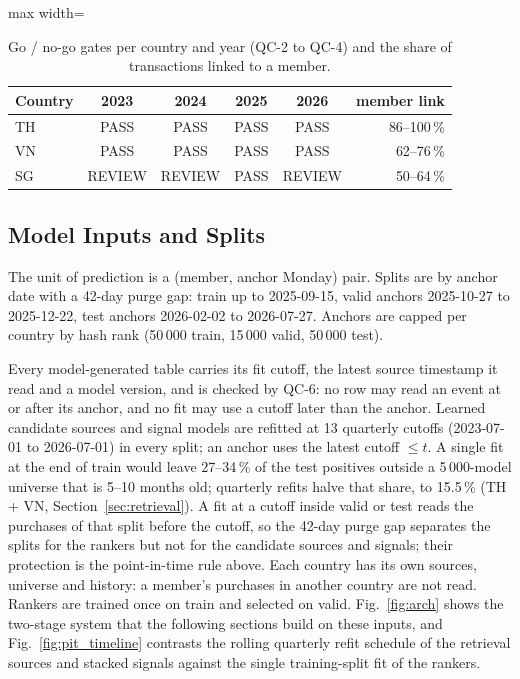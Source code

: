 \documentclass{ieeeaccess}
\begin{document}
\begin{table}[t]
\caption{Go / no-go gates per country and year (QC-2 to QC-4) and the share of transactions linked to a member.}
\label{tab:gates}
\setlength{\tabcolsep}{4pt}
\centering
\begin{adjustbox}{max width=\columnwidth}
\begin{tabular}{lccccr}
\toprule
Country & 2023 & 2024 & 2025 & 2026 & member link \\
\midrule
TH & PASS   & PASS   & PASS & PASS   & 86--100\,\% \\
VN & PASS   & PASS   & PASS & PASS   & 62--76\,\% \\
SG & REVIEW & REVIEW & PASS & REVIEW & 50--64\,\% \\
\bottomrule
\end{tabular}
\end{adjustbox}
\end{table}

\subsection{Model Inputs and Splits}
The unit of prediction is a (member, anchor Monday) pair. Splits are by anchor date with a 42-day purge gap: train up to
2025-09-15, valid anchors 2025-10-27 to 2025-12-22, test anchors 2026-02-02 to 2026-07-27. Anchors are capped per country by hash
rank (50\,000 train, 15\,000 valid, 50\,000 test).

Every model-generated table carries its fit cutoff, the latest source timestamp it read and a model version, and is checked by QC-6:
no row may read an event at or after its anchor, and no fit may use a cutoff later than the anchor. Learned candidate sources and
signal models are refitted at 13 quarterly cutoffs (2023-07-01 to 2026-07-01) in every split; an anchor uses the latest cutoff
$\le t$. A single fit at the end of train would leave 27--34\,\% of the test positives outside a 5\,000-model universe that is
5--10 months old; quarterly refits halve that share, to 15.5\,\% (TH + VN, Section~\ref{sec:retrieval}). A fit at a cutoff inside
valid or test reads the purchases of that split before the cutoff, so the 42-day purge gap separates the splits for the rankers but
not for the candidate sources and signals; their protection is the point-in-time rule above. Each country has its own sources,
universe and history: a member's purchases in another country are not read. Rankers are trained once on train and selected on
valid. Fig.~\ref{fig:arch} shows the two-stage system that the following sections build on these inputs, and Fig.~\ref{fig:pit_timeline}
contrasts the rolling quarterly refit schedule of the retrieval sources and stacked signals against the single training-split fit of the rankers.
\end{document}
